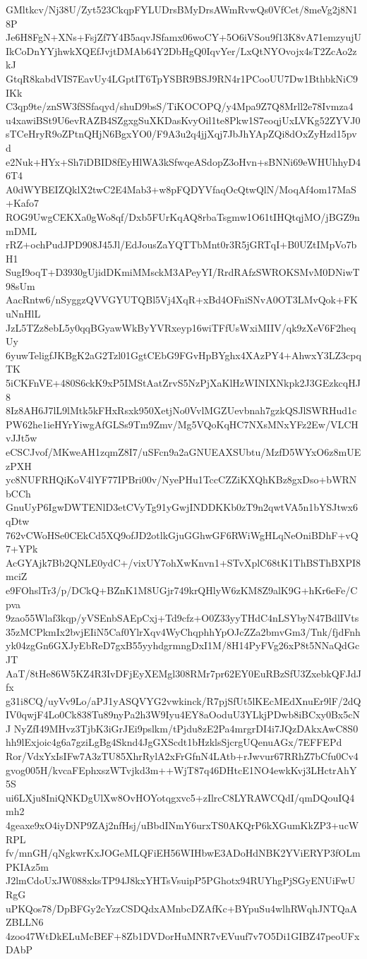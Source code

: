 GMltkcv/Nj38U/Zyt523CkqpFYLUDrsBMyDrsAWmRvwQs0VfCet/8meVg2j8N18P
Je6H8FgN+XNs+FsjZf7Y4B5aqvJSfamx06woCY+5O6iVSou9f13K8vA71emzyujU
IkCoDnYYjhwkXQEfJvjtDMAb64Y2DbHgQ0IqvYer/LxQtNYOvojx4sT2ZcAo2zkJ
GtqR8kabdVIS7EavUy4LGptIT6TpYSBR9BSJ9RN4r1PCooUU7Dw1BthbkNiC9IKk
C3qp9te/znSW3fSSfaqyd/shuD9bsS/TiKOCOPQ/y4Mpa9Z7Q8Mrll2e78Ivmza4
u4xawiBSt9U6evRAZB4SZgxgSuXKDasKvyOil1te8Pkw1S7eoqjUxLVKg52ZYVJ0
sTCeHryR9oZPtnQHjN6BgxYO0/F9A3u2q4jjXqj7JbJhYApZQi8dOxZyHzd15pvd
e2Nuk+HYx+Sh7iDBID8fEyHlWA3kSfwqeASdopZ3oHvn+sBNNi69eWHUhhyD46T4
A0dWYBEIZQklX2twC2E4Mab3+w8pFQDYVfaqOcQtwQlN/MoqAf4om17MaS+Kafo7
ROG9UwgCEKXa0gWo8qf/Dxb5FUrKqAQ8rbaTsgmw1O61tIHQtqjMO/jBGZ9nmDML
rRZ+ochPudJPD908J45Jl/EdJousZaYQTTbMnt0r3R5jGRTqI+B0UZtIMpVo7bH1
SugI9oqT+D3930gUjidDKmiMMsckM3APeyYI/RrdRAfzSWROKSMvM0DNiwT98sUm
AacRntw6/nSyggzQVVGYUTQBl5Vj4XqR+xBd4OFniSNvA0OT3LMvQok+FKuNnHlL
JzL5TZz8ebL5y0qqBGyawWkByYVRxeyp16wiTFfUsWxiMIIV/qk9zXeV6F2heqUy
6yuwTeligfJKBgK2aG2Tzl01GgtCEbG9FGvHpBYghx4XAzPY4+AhwxY3LZ3cpqTK
5iCKFnVE+480S6ckK9xP5IMStAatZrvS5NzPjXaKlHzWINIXNkpk2J3GEzkcqHJ8
8Iz8AH6J7lL9lMtk5kFHxRsxk950XetjNo0VvlMGZUevbnah7gzkQSJlSWRHud1c
PW62he1ieHYrYiwgAfGLSs9Tm9Zmv/Mg5VQoKqHC7NXsMNxYFz2Ew/VLCHvJJt5w
eCSCJvof/MKweAH1zqmZ8I7/uSFcn9a2aGNUEAXSUbtu/MzfD5WYxO6z8mUEzPXH
yc8NUFRHQiKoV4lYF77IPBri00v/NyePHu1TccCZZiKXQhKBz8gxDso+bWRNbCCh
GnuUyP6IgwDWTENlD3etCVyTg91yGwjINDDKKb0zT9n2qwtVA5n1bYSJtwx6qDtw
762vCWoHSe0CEkCd5XQ9ofJD2otlkGjuGGhwGF6RWiWgHLqNeOniBDhF+vQ7+YPk
AcGYAjk7Bb2QNLE0ydC+/vixUY7ohXwKnvn1+STvXplC68tK1ThBSThBXPI8mciZ
e9FOhslTr3/p/DCkQ+BZnK1M8UGjr749krQHlyW6zKM8Z9alK9G+hKr6eFe/Cpva
9zao55Wlaf3kqp/yVSEnbSAEpCxj+Td9cfz+O0Z33yyTHdC4nLSYbyN47BdlIVts
35zMCPkmIx2bvjEIiN5Caf0YlrXqv4WyChqphhYpOJcZZa2bmvGm3/Tnk/fjdFnh
yk04zgGn6GXJyEbReD7gxB55yyhdgrmngDxI1M/8H14PyFVg26xP8t5NNaQdGcJT
AaT/8tHe86W5KZ4R3IvDFjEyXEMgl308RMr7pr62EY0EuRBzSfU3ZxebkQFJdJfx
g31i8CQ/uyVv9Lo/aPJ1yASQVYG2vwkinck/R7pjSfUt5lKEcMEdXnuEr9lF/2dQ
IV0qwjF4Lo0Ck838Tu89nyPa2h3W9Iyu4EY8aOoduU3YLkjPDwb8iBCxy0Bx5cNJ
NyZfI49MHvz3TjbK3iGrJEi9pslkm/tPjdu8zE2Pa4mrgrDI4i7JQzDAkxAwC8S0
hh9lExjoic4g6a7gziLgBg4Sknd4JgGXScdt1bHzklsSjcrgUQenuAGx/7EFFEPd
Ror/VdxYxIsIFw7A3zTU85XhrRylA2xFrGfnN4LAtb+rJwvur67RRhZ7bCfu0Cv4
gvog005H/kvcaFEphxszWTvjkd3m++WjT87q46DHtcE1NO4ewkKvj3LHctrAhY5S
ui6LXju8IniQNKDgUlXw8OvHOYotqgxvc5+zIlrcC8LYRAWCQdI/qmDQouIQ4mh2
4geaxe9xO4iyDNP9ZAj2nfHsj/uBbdINmY6urxTS0AKQrP6kXGumKkZP3+ucWRPL
fv/mnGH/qNgkwrKxJOGeMLQFiEH56WIHbwE3ADoHdNBK2YViERYP3fOLmPKIAz5m
J2lmCdoUxJW088xksTP94J8kxYHTsVsuipP5PGhotx94RUYhgPjSGyENUiFwURgG
uPKQos78/DpBFGy2cYzzCSDQdxAMnbcDZAfKc+BYpuSu4wlhRWqhJNTQaAZBLLN6
4zoo47WtDkELuMcBEF+8Zb1DVDorHuMNR7vEVuuf7v7O5Di1GIBZ47peoUFxDAbP
